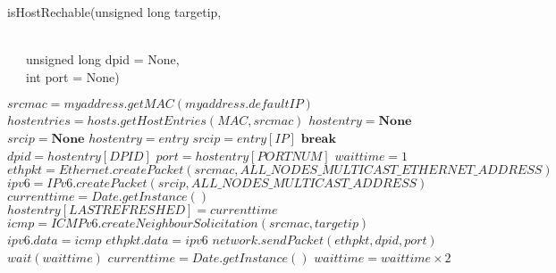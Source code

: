 \documentclass[10pt,a4paper,titlepage]{report}
\begin{document}

\begin{algorithm}
	\caption{isHostRechable(unsigned long targetip,} \\
	\qquad \qquad \qquad \qquad \ \ \ unsigned long dpid = None, \\
	\qquad \qquad \qquad \qquad \ \ \ int port = None)
	\begin{algorithmic}[1]
		\STATE $srcmac = myaddress.getMAC(myaddress.defaultIP)$
		\STATE $hostentries = hosts.getHostEntries(MAC, srcmac)$
		\STATE $hostentry = \textbf{None}$
		\STATE $srcip = \textbf{None}$
				\STATE $hostentry = entry$
				\STATE $srcip = entry[IP]$
				\STATE $\textbf{break}$
			\ENDIF
		\ENDFOR
			\STATE $dpid = hostentry[DPID]$
			\STATE $port = hostentry[PORTNUM]$
		\ENDIF
			\STATE $waittime = 1$
			\STATE $ethpkt = Ethernet.createPacket(srcmac, ALL\_NODES\_MULTICAST\_ETHERNET\_ADDRESS)$
			\STATE $ipv6 = IPv6.createPacket(srcip, ALL\_NODES\_MULTICAST\_ADDRESS)$
				\STATE $currenttime = Date.getInstance()$
				\STATE $hostentry[LASTREFRESHED] = currenttime$
				\STATE $icmp = ICMPv6.createNeighbourSolicitation(srcmac, targetip)$
				\STATE $ipv6.data = icmp$
				\STATE $ethpkt.data = ipv6$
				\STATE $network.sendPacket(ethpkt, dpid, port)$
				\STATE $wait(waittime)$
				\STATE $currenttime = Date.getInstance()$
					\RETURN \TRUE
				\ELSE
					\STATE $waittime = waittime \times 2$
				\ENDIF
			\ENDFOR
			\RETURN \FALSE
		\ELSE
			\RETURN \FALSE
		\ENDIF
		
	\end{algorithmic}
\end{algorithm}
\end{document}
